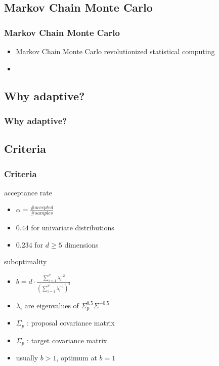 

\subsection{Markov Chain Monte Carlo}
\begin{frame}
\frametitle{Markov Chain Monte Carlo}
\begin{itemize}


\item Markov Chain Monte Carlo revolutionized statistical computing 
\item 
\end{itemize}
\end{frame}


\subsection{Why adaptive?}
\begin{frame}
\frametitle{Why adaptive?}

\end{frame}


\subsection{Criteria}
\begin{frame}
\frametitle{Criteria}
\begin{block}{acceptance rate}
\begin{itemize}
  \item $\alpha = \frac{\# accepted}{\# samples}$
  \item $0.44$ for univariate distributions
  \item $0.234$ for $d\geq 5$ dimensions
\end{itemize}

\end{block}
\begin{block}{suboptimality}
\begin{itemize}
  \item $b = d\cdot \frac{\sum_{i=1}^d \lambda_i^{-2}}{(\sum_{i=1}^d
  \lambda_i^{-1})^2}$
  \item $\lambda_i$ are eigenvalues of $\Sigma_p^{0.5}\Sigma^{-0.5}$
  \item $\Sigma_p$ : proposal covariance matrix
  \item $\Sigma_p$ : target covariance matrix
  \item usually $b>1$, optimum at $b=1$
\end{itemize}

\end{block}
\end{frame}

